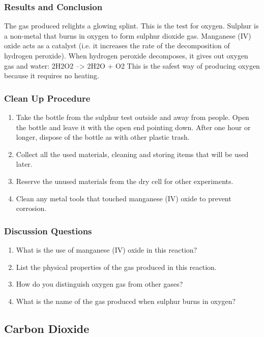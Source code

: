\subsubsection*{Results and Conclusion}
The gas produced relights a glowing splint. This is the test for oxygen. Sulphur is a non-metal that burns in oxygen to form sulphur dioxide gas. Manganese (IV) oxide acts as a catalyst (i.e. it increases the rate of the decomposition of hydrogen peroxide). When hydrogen peroxide decomposes, it gives out oxygen gas and water:
2H2O2 --> 2H2O + O2
This is the safest way of producing oxygen because it requires no heating.

\subsubsection*{Clean Up Procedure}
\begin{enumerate}
\item{Take the bottle from the sulphur test outside and away from people. Open the bottle and leave it with the open end pointing down. After one hour or longer, dispose of the bottle as with other plastic trash.}
\item{Collect all the used materials, cleaning and storing items that will be used later.}
\item{Reserve the unused materials from the dry cell for other experiments.}
\item{Clean any metal tools that touched manganese (IV) oxide to prevent corrosion.}
\end{enumerate}

\subsubsection*{Discussion Questions}
\begin{enumerate}
\item{What is the use of manganese (IV) oxide in this reaction?}
\item{List the physical properties of the gas produced in this reaction.}
\item{How do you distinguish oxygen gas from other gases?}
\item{What is the name of the gas produced when sulphur burns in oxygen?}
\end{enumerate}

\subsection{Carbon Dioxide}

